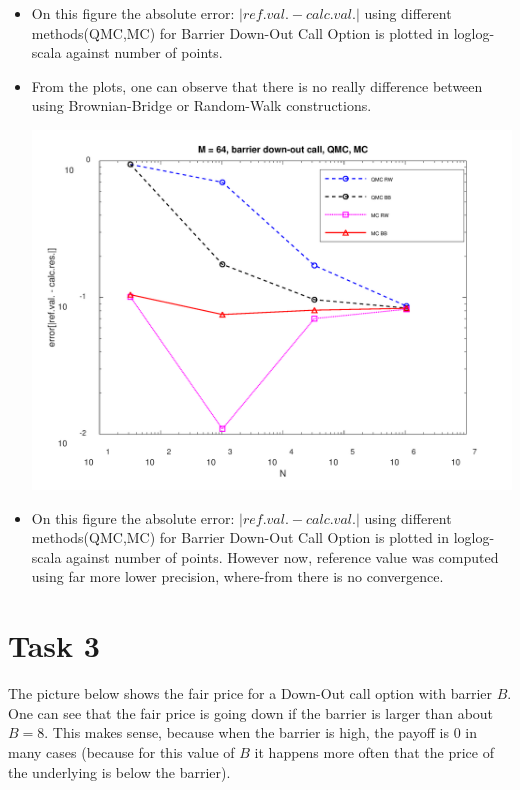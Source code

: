 \documentclass[10pt,a4paper]{article}
\begin{document}
\begin{itemize}
    \item{On this figure the absolute error: $|ref.val.-calc.val.|$ using different methods(QMC,MC) for Barrier Down-Out Call Option is plotted in loglog-scala against number of points.
    }
\item{
From the plots, one can observe that there is no really difference between using Brownian-Bridge or Random-Walk constructions.
}

\begin{center}
	\includegraphics[scale=0.25]{images/task2_error_coarse_discretisation.png}
\end{center}
\item{
On this figure the absolute error: $|ref.val.-calc.val.|$ using different methods(QMC,MC) for Barrier Down-Out Call Option is plotted in loglog-scala against number of points. However now, reference value was computed using far more lower precision, where-from there is no convergence. 
}

\end{itemize}

\newpage

\section*{Task 3}

The picture below shows the fair price for a Down-Out call option with barrier $B$. One can see that the fair price is going down if the barrier is larger than about $B=8$. This makes sense, because when the barrier is high, the payoff is $0$ in many cases (because for this value of $B$ it happens more often that the price of the underlying is below the barrier).
\end{document}
